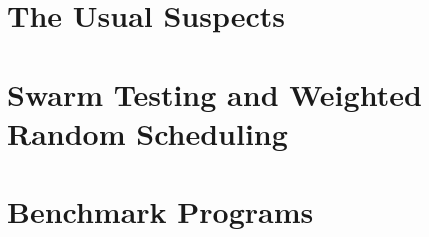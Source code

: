\blindtext

\section{The Usual Suspects}
\label{sec:algorithms-usual}

\blindtext

\section{Swarm Testing and Weighted Random Scheduling}
\label{sec:algorithms-swarm}

\blindtext

\section{Benchmark Programs}
\label{sec:algorithms-sctbench}

\blindtext
